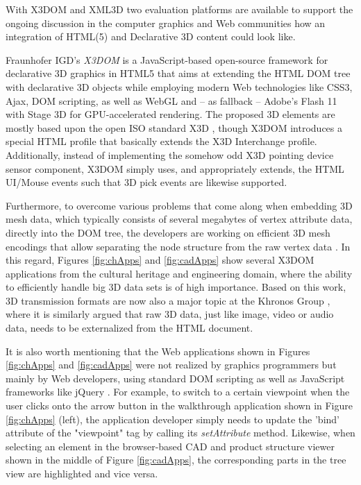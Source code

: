 \documentclass{acmsiggraph}
\begin{document}
With X3DOM \cite{Behr2009} and XML3D \cite{Sons2010} two evaluation platforms are available to support the ongoing discussion in the computer graphics and Web communities how an integration of HTML(5) and Declarative 3D content could look like. 

Fraunhofer IGD's \emph{X3DOM} \cite{Behr2009,Behr12} is a JavaScript-based open-source framework for declarative 3D graphics in HTML5 that aims at extending the HTML DOM tree with declarative 3D objects while employing modern Web technologies like CSS3, Ajax, DOM scripting, as well as WebGL and -- as fallback -- Adobe's Flash 11 with Stage 3D \cite{flash} for GPU-accelerated rendering. The proposed 3D elements are mostly based upon the open ISO standard X3D \cite{Web3D-X3D}, though X3DOM introduces a special HTML profile that basically extends the X3D Interchange profile. Additionally, instead of implementing the somehow odd X3D pointing device sensor component, X3DOM simply uses, and appropriately extends, the HTML UI/Mouse events such that 3D pick events are likewise supported.

Furthermore, to overcome various problems that come along when embedding 3D mesh data, which typically consists of several megabytes of vertex attribute data, directly into the DOM tree, the developers are working on efficient 3D mesh encodings that allow separating the node structure from the raw vertex data \cite{Behr12}. In this regard, Figures \ref{fig:chApps} and \ref{fig:cadApps} show several X3DOM applications from the cultural heritage and engineering domain, where the ability to efficiently handle big 3D data sets is of high importance.
Based on this work, 3D transmission formats are now also a major topic at the Khronos Group \cite{Trevett12}, where it is similarly argued that raw 3D data, just like image, video or audio data, needs to be externalized from the HTML document.

It is also worth mentioning that the Web applications shown in Figures \ref{fig:chApps} and \ref{fig:cadApps} were not realized by graphics programmers but mainly by Web developers, using standard DOM scripting as well as JavaScript frameworks like jQuery \cite{jquery}. For example, to switch to a certain viewpoint when the user clicks onto the arrow button in the walkthrough application shown in Figure \ref{fig:chApps} (left), the application developer simply needs to update the 'bind' attribute of the "viewpoint" tag by calling its \emph{setAttribute} method.
Likewise, when selecting an element in the browser-based CAD and product structure viewer shown in the middle of Figure \ref{fig:cadApps}, the corresponding parts in the tree view are highlighted and vice versa.
\end{document}
